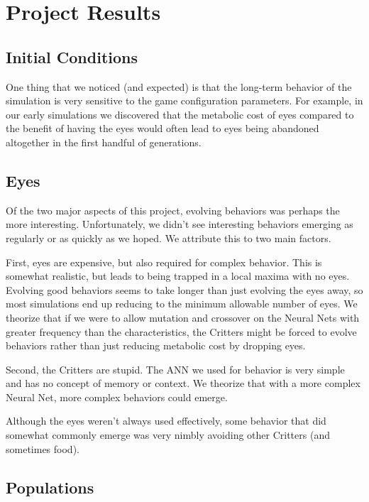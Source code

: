 
\chapter{Project Results}
\label{chap:results}

\section{Initial Conditions}

One thing that we noticed (and expected) is that the long-term behavior of the simulation is very sensitive to the game configuration parameters. For example, in our early simulations we discovered that the metabolic cost of eyes compared to the benefit of having the eyes would often lead to eyes being abandoned altogether in the first handful of generations.

\section{Eyes}

Of the two major aspects of this project, evolving behaviors was perhaps the more interesting. Unfortunately, we didn't see interesting behaviors emerging as regularly or as quickly as we hoped. We attribute this to two main factors.

First, eyes are expensive, but also required for complex behavior. This is somewhat realistic, but leads to being trapped in a local maxima with no eyes. Evolving good behaviors seems to take longer than just evolving the eyes away, so most simulations end up reducing to the minimum allowable number of eyes. We theorize that if we were to allow mutation and crossover on the Neural Nets with greater frequency than the characteristics, the Critters might be forced to evolve behaviors rather than just reducing metabolic cost by dropping eyes.

Second, the Critters are stupid. The ANN we used for behavior is very simple and has no concept of memory or context. We theorize that with a more complex Neural Net, more complex behaviors could emerge.

Although the eyes weren't always used effectively, some behavior that did somewhat commonly emerge was very nimbly avoiding other Critters (and sometimes food).

\section{Populations}

